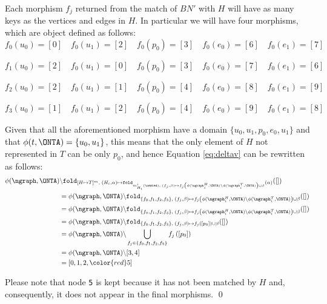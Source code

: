\begin{example}[continues=ex:firstforgrammars,label=ex:firstforgrammars1]
	Each morphism $f_j$ returned from the match of $BN'$ with $H$ will have as many keys as the vertices and edges in $H$. In particular we will have four morphisms,  which are object defined as follows:
\[f_0(u_0)=[0]\quad f_0(u_1)=[2]\quad f_0(p_0)=[3]\quad f_0(e_0)=[6]\quad f_0(e_1)=[7]\]
	
\[f_1(u_0)=[2]\quad f_0(u_1)=[0]\quad f_0(p_0)=[3]\quad f_0(e_0)=[7]\quad f_0(e_1)=[6]\]

\[f_2(u_0)=[2]\quad f_0(u_1)=[1]\quad f_0(p_0)=[4]\quad f_0(e_0)=[8]\quad f_0(e_1)=[9]\]

\[f_3(u_0)=[1]\quad f_0(u_1)=[2]\quad f_0(p_0)=[4]\quad f_0(e_0)=[9]\quad f_0(e_1)=[8]\]
	
	
	
	Given that all the aforementioned morphism have a domain $\{u_0,u_1,p_0,e_0,u_1\}$ and that $\phi(t,\ONTA)=\{u_0,u_1\}$, this means that the only element of $H$ not represented in $T$
	can be only $p_0$, and hence Equation \ref{eq:deltav} can be rewritten as follows:
	\[\begin{split}
	\phi(\ngraph,\ONTA)&\backslash\texttt{fold}_{[H\mapsto T]^m,\;(H_i,\alpha)\mapsto \texttt{fold}_{m^i_{H_i}(\nested),\;(f_j,\beta)\mapsto f_j\left(\phi(\ngraph_i^H,\ONTA)\backslash\phi(\ngraph_i^T,\ONTA)\right)\cup\beta }(\alpha)}([])\\
	&=\phi(\ngraph,\ONTA)\backslash\texttt{fold}_{\{f_0,f_1,f_2,f_3\},\;(f_j,\beta)\mapsto f_j\left(\phi(\ngraph_i^H,\ONTA)\backslash\phi(\ngraph_i^T,\ONTA)\right)\cup\beta }([])\\
	&=\phi(\ngraph,\ONTA)\backslash\texttt{fold}_{\{f_0,f_1,f_2,f_3\},\;(f_j,\beta)\mapsto f_j\left(\phi(\ngraph_i^H,\ONTA)\backslash\phi(\ngraph_i^T,\ONTA)\right)\cup\beta }([])\\
	&=\phi(\ngraph,\ONTA)\backslash\texttt{fold}_{\{f_0,f_1,f_2,f_3\},\;(f_j,\beta)\mapsto f_j\left([p_0]\right)\cup\beta }([])\\	
	&=\phi(\ngraph,\ONTA)\backslash\bigcup_{f_j\in \{f_0,f_1,f_2,f_3\}} f_j\left([p_0]\right) \\
	&=\phi(\ngraph,\ONTA)\backslash[3,4] \\
	&=[0,1,2,{\color{red}5}]
	\end{split}\]

Please note that node \texttt{\color{red}5} is kept because it has not been matched by $H$ and, consequently, it does not appear in the final morphisms.
	\qed
\end{example}

